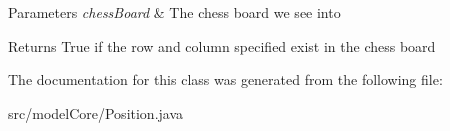 \begin{DoxyParams}{Parameters}
{\em chess\+Board} & The chess board we see into \\
\hline
\end{DoxyParams}
\begin{DoxyReturn}{Returns}
True if the row and column specified exist in the chess board 
\end{DoxyReturn}


The documentation for this class was generated from the following file\+:\begin{DoxyCompactItemize}
\item 
src/model\+Core/Position.\+java\end{DoxyCompactItemize}
